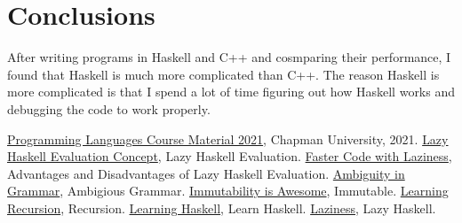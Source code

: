 \documentclass{article}
\begin{document}
\section{Conclusions}\label{conclusions}
After writing programs in Haskell and C++ and cosmparing their performance, I found that Haskell is much more complicated than C++. The reason Haskell is more complicated is that I spend a lot of time figuring out how Haskell works and debugging the code to work properly. 
\begin{thebibliography}{99}
 \href{https://github.com/alexhkurz/programming-languages-2021/blob/main/lecture-by-lecture.md}{Programming Languages Course Material 2021}, Chapman University, 2021.
 \href{https://livebook.manning.com/concept/haskell/lazy-evaluation}{Lazy Haskell Evaluation Concept}, Lazy Haskell Evaluation.
 \href{https://mmhaskell.com/blog/2017/1/16/faster-code-with-laziness}{Faster Code with Laziness}, Advantages and Disadvantages of Lazy Haskell Evaluation.
 \href{https://www.javatpoint.com/automata-ambiguity-in-grammar}{Ambiguity in Grammar}, Ambigious Grammar.
 \href{https://mmhaskell.com/blog/2017/1/9/immutability-is-awesome}{Immutability is Awesome}, Immutable.
 \href{http://learnyouahaskell.com/recursion}{Learning Recursion}, Recursion.
 \href{https://wiki.haskell.org/Learning_Haskell}{Learning Haskell}, Learn Haskell.
 \href{https://www.schoolofhaskell.com/school/starting-with-haskell/introduction-to-haskell/6-laziness}{Laziness}, Lazy Haskell.
\end{thebibliography}
\end{document}
